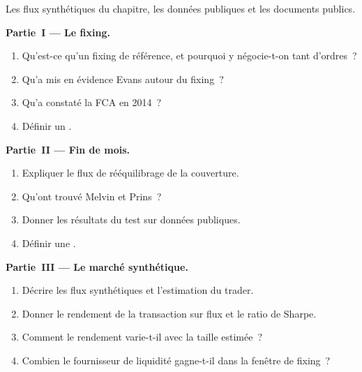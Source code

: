 \begin{problem}\label{pb:s2:fx-flow-strategies:1}
Les flux synthétiques du chapitre, les données publiques et les documents publics.

\medskip\noindent\textbf{Partie~I --- Le fixing.}
\begin{enumerate}
\item Qu'est-ce qu'un fixing de référence, et pourquoi y négocie-t-on tant d'ordres~?
\item Qu'a mis en évidence Evans autour du fixing~?
\item Qu'a constaté la FCA en 2014~?
\item Définir un .
\end{enumerate}

\medskip\noindent\textbf{Partie~II --- Fin de mois.}
\begin{enumerate}[resume]
\item Expliquer le flux de rééquilibrage de la couverture.
\item Qu'ont trouvé Melvin et Prins~?
\item Donner les résultats du test sur données publiques.
\item Définir une .
\end{enumerate}

\medskip\noindent\textbf{Partie~III --- Le marché synthétique.}
\begin{enumerate}[resume]
\item Décrire les flux synthétiques et l'estimation du trader.
\item Donner le rendement de la transaction sur flux et le ratio de Sharpe.
\item Comment le rendement varie-t-il avec la taille estimée~?
\item Combien le fournisseur de liquidité gagne-t-il dans la fenêtre de fixing~?
\end{enumerate}


\end{problem}

